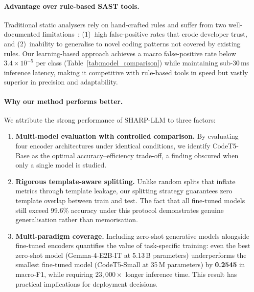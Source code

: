 \documentclass[conference]{IEEEtran}
\begin{document}
\paragraph{Advantage over rule-based SAST tools.}
Traditional static analysers rely on hand-crafted rules and suffer from
two well-documented limitations~\cite{johnson2013why}: (1)~high
false-positive rates that erode developer trust, and (2)~inability to
generalise to novel coding patterns not covered by existing rules.  Our
learning-based approach achieves a macro false-positive rate below
$3.4 \times 10^{-5}$ per class (Table~\ref{tab:model_comparison}) while
maintaining sub-30\,ms inference latency, making it competitive with
rule-based tools in speed but vastly superior in precision and
adaptability.

\paragraph{Why our method performs better.}
We attribute the strong performance of SHARP-LLM to three factors:
\begin{enumerate}
    \item \textbf{Multi-model evaluation with controlled comparison.}
          By evaluating four encoder architectures under identical
          conditions, we identify CodeT5-Base as the optimal
          accuracy--efficiency trade-off, a finding obscured when only a
          single model is studied.
    \item \textbf{Rigorous template-aware splitting.}
          Unlike random splits that inflate metrics through template
          leakage, our splitting strategy guarantees zero template overlap
          between train and test.  The fact that all fine-tuned models
          still exceed 99.6\% accuracy under this protocol demonstrates
          genuine generalisation rather than memorisation.
    \item \textbf{Multi-paradigm coverage.}
          Including zero-shot generative models alongside fine-tuned
          encoders quantifies the value of task-specific training:
          even the best zero-shot model (Gemma-4-E2B-IT at 5.13\,B
          parameters) underperforms the smallest fine-tuned model
          (CodeT5-Small at 35\,M parameters) by \textbf{0.2545} in
          macro-F1, while requiring $23{,}000\times$ longer inference
          time.  This result has practical implications for deployment
          decisions.
\end{enumerate}
\end{document}
